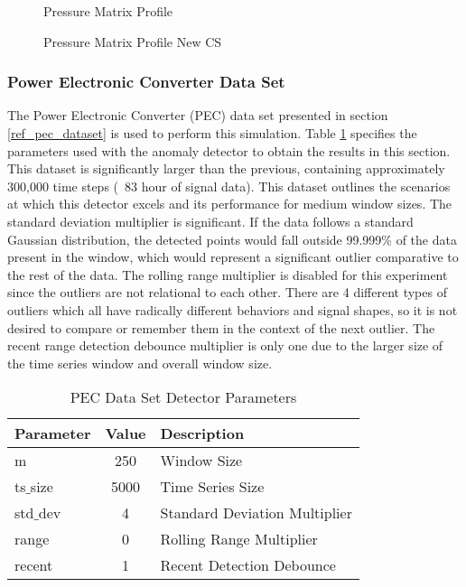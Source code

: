 \begin{figure}[H]
    \begin{minipage}[t]{0.5\linewidth}
        \centering
        \resizebox{\linewidth}{!}{}
        \caption{Pressure Matrix Profile}
        \label{fig:mp_hist_standard_pressure}
    \end{minipage}
    \begin{minipage}[t]{0.5\linewidth}
        \centering
        \resizebox{\linewidth}{!}{}
        \caption{Pressure Matrix Profile New CS}
        \label{fig:mp_hist_signal_pressure}
    \end{minipage}
\end{figure}

\subsubsection{Power Electronic Converter Data Set}
\label{ref_results_pec_sim}
The Power Electronic Converter (PEC) data set presented in section \ref{ref_pec_dataset} is used to perform this simulation. Table \ref{tab:pec_sim_params} specifies the parameters used with the anomaly detector to obtain the results in this section. This dataset is significantly larger than the previous, containing approximately 300,000 time steps (~83 hour of signal data). This dataset outlines the scenarios at which this detector excels and its performance for medium window sizes. The standard deviation multiplier is significant. If the data follows a standard Gaussian distribution, the detected points would fall outside 99.999\% of the data present in the window, which would represent a significant outlier comparative to the rest of the data. The rolling range multiplier is disabled for this experiment since the outliers are not relational to each other. There are 4 different types of outliers which all have radically different behaviors and signal shapes, so it is not desired to compare or remember them in the context of the next outlier. The recent range detection debounce multiplier is only one due to the larger size of the time series window and overall window size.

\begin{table}[H]
\centering
\begin{tabular}{|l|c|l|}
    \hline
	\textbf{Parameter} & \textbf{Value} & \textbf{Description} \\ \hline
	m & 250 & Window Size \\ \hline
	ts$\_$size & 5000 & Time Series Size \\ \hline
	std$\_$dev & 4 & Standard Deviation Multiplier \\ \hline
	range & 0 & Rolling Range Multiplier\\ \hline
	recent & 1 & Recent Detection Debounce\\ \hline
\end{tabular}
\caption{PEC Data Set Detector Parameters}
\label{tab:pec_sim_params}
\end{table}


